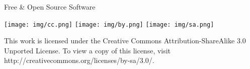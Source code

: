 \documentclass{beamer}
\begin{document}
  
\begin{frame}{Free & Open Source Software}

\texttt{[image: img/cc.png]}
\texttt{[image: img/by.png]}
\texttt{[image: img/sa.png]}

This work is licensed under the Creative Commons Attribution-ShareAlike 3.0 Unported License. To view a copy of this license, visit http://creativecommons.org/licenses/by-sa/3.0/.
\end{frame}
\end{document}
